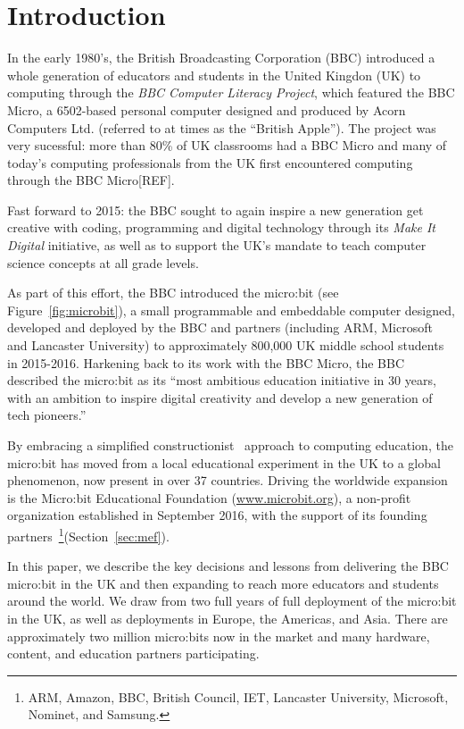 \section{Introduction}
\label{sec:intrp}

In the early 1980's, the British Broadcasting Corporation (BBC)
introduced a whole generation of educators and students in the United Kingdon (UK)
to computing through the {\em BBC Computer Literacy Project}, which featured the BBC Micro,
a 6502-based personal computer designed and produced by Acorn Computers Ltd. (referred
to at times as the ``British Apple'').  The project was very sucessful:
more than 80\% of UK classrooms had a BBC Micro and many of today's
computing professionals from the UK first encountered computing through
the BBC Micro[REF].

Fast forward to 2015: the BBC sought to again inspire a new
generation get creative with coding, programming and digital technology
through its {\em Make It Digital} initiative, as well as to support the UK's mandate to
teach computer science concepts at all grade levels.~\cite{PeytonJones2013ICFP}

As part of this effort, the BBC introduced the micro:bit (see
Figure~\ref{fig:microbit}),
a small programmable and embeddable computer designed,
developed and deployed by the BBC and partners (including ARM, Microsoft
and Lancaster University) to approximately 800,000 UK middle school students
in 2015-2016. Harkening back to its work with the BBC Micro,
the BBC described the micro:bit as its ``most ambitious education initiative in 30 years,
with an ambition to inspire digital creativity and
develop a new generation of tech pioneers.''~\cite{BBCwebsite}

By embracing a simplified constructionist~\cite{Papert} approach to computing education, the micro:bit has moved from
a local educational experiment in the UK to a global phenomenon, now present in over 37 countries.
Driving the worldwide expansion is
the Micro:bit Educational Foundation (\url{www.microbit.org}),
a non-profit organization
established in September 2016, with the support of its founding partners~\footnote{ARM,
Amazon, BBC, British Council, IET, Lancaster University, Microsoft,
Nominet, and Samsung.}(Section~\ref{sec:mef}).

In this paper, we describe the key decisions and lessons from
delivering the BBC micro:bit in the UK and then expanding to reach
more educators and students around the world.
We draw from two full years of
full deployment of the micro:bit in the UK, as well as deployments
in Europe, the Americas, and Asia.  There are approximately
two million micro:bits now in the market and many hardware,
content, and education partners participating.

